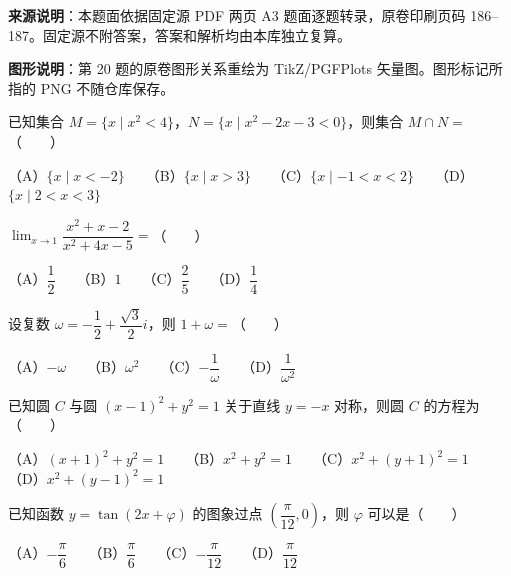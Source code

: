 


\begin{gktip}
\textbf{来源说明}：本题面依据固定源 PDF 两页 A3 题面逐题转录，原卷印刷页码 186–187。固定源不附答案，答案和解析均由本库独立复算。

\textbf{图形说明}：第 20 题的原卷图形关系重绘为 TikZ/PGFPlots 矢量图。图形标记所指的 PNG 不随仓库保存。
\end{gktip}


\begin{question}
已知集合 $M=\{x\mid x^2<4\}$，$N=\{x\mid x^2-2x-3<0\}$，则集合 $M\cap N=$\mbox{（　　）}

（A）$\{x\mid x<-2\}$　　（B）$\{x\mid x>3\}$　　（C）$\{x\mid-1<x<2\}$　　（D）$\{x\mid2<x<3\}$

\end{question}
\begin{question}
$\displaystyle\lim_{x\to1}\dfrac{x^2+x-2}{x^2+4x-5}=$\mbox{（　　）}

（A）$\dfrac12$　　（B）$1$　　（C）$\dfrac25$　　（D）$\dfrac14$

\end{question}
\begin{question}
设复数 $\omega=-\dfrac12+\dfrac{\sqrt3}{2}i$，则 $1+\omega=$\mbox{（　　）}

（A）$-\omega$　　（B）$\omega^2$　　（C）$-\dfrac1\omega$　　（D）$\dfrac1{\omega^2}$

\end{question}
\begin{question}
已知圆 $C$ 与圆 $(x-1)^2+y^2=1$ 关于直线 $y=-x$ 对称，则圆 $C$ 的方程为\mbox{（　　）}

（A）$(x+1)^2+y^2=1$　　（B）$x^2+y^2=1$　　（C）$x^2+(y+1)^2=1$　　（D）$x^2+(y-1)^2=1$

\end{question}
\begin{question}
已知函数 $y=\tan(2x+\varphi)$ 的图象过点 $\left(\dfrac\pi{12},0\right)$，则 $\varphi$ 可以是\mbox{（　　）}

（A）$-\dfrac\pi6$　　（B）$\dfrac\pi6$　　（C）$-\dfrac\pi{12}$　　（D）$\dfrac\pi{12}$

\end{question}
